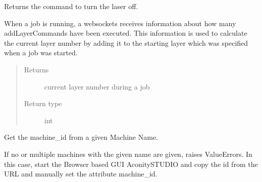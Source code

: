 \documentclass[letterpaper,10pt,english,openany,oneside]{sphinxmanual}
\begin{document}
\begin{fulllineitems}
\begin{fulllineitems}
\label{\detokenize{_modules/AconitySTUDIO_client:AconitySTUDIO_client.AconitySTUDIO_client.get_lasers_off_cmds}}
Returns the command to turn the laser off.

\end{fulllineitems}


\begin{fulllineitems}
\label{\detokenize{_modules/AconitySTUDIO_client:AconitySTUDIO_client.AconitySTUDIO_client.get_last_built_layer}}
When a job is running, a websockets receives information about how many addLayerCommands have been executed.
This information is used to calculate the current layer number by adding it to the starting layer which was specified when a job was started.
\begin{quote}\begin{description}
\item[{Returns}] \leavevmode
current layer number during a job

\item[{Return type}] \leavevmode
int

\end{description}\end{quote}

\end{fulllineitems}


\begin{fulllineitems}
\label{\detokenize{_modules/AconitySTUDIO_client:AconitySTUDIO_client.AconitySTUDIO_client.get_machine_id}}
Get the machine\_id from a given Machine Name.

If no or multiple machines with the given name are given, raises ValueErrors.
In this case, start the Browser based GUI AconitySTUDIO and copy the id from the URL and manually set the attribute machine\_id.


\end{fulllineitems}
\end{fulllineitems}
\end{document}
